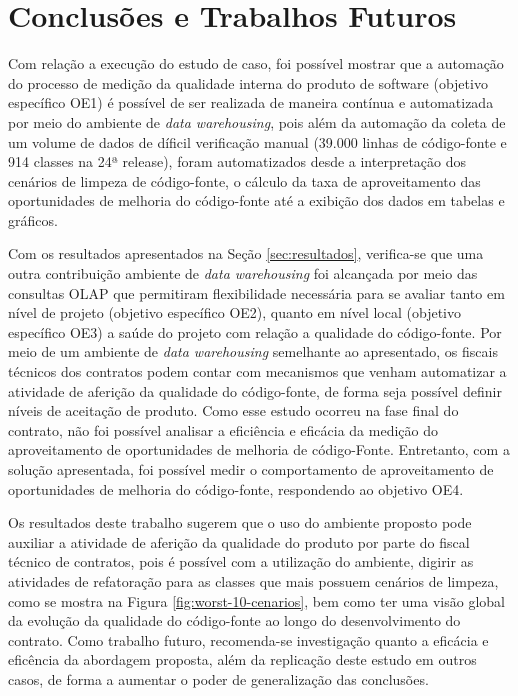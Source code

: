 \section{Conclusões e Trabalhos Futuros}


Com relação a execução do estudo de caso, foi possível mostrar que a automação do processo de medição da qualidade interna do produto de software (objetivo específico OE1)  é possível de ser realizada de maneira contínua e automatizada por meio do ambiente de \textit{data warehousing}, pois além da automação da coleta de um volume de dados de díficil verificação manual (39.000 linhas de código-fonte e 914 classes na 24ª release), foram automatizados desde a interpretação dos cenários de limpeza de código-fonte, o cálculo da taxa de aproveitamento das oportunidades de melhoria do código-fonte até a exibição dos dados em tabelas e gráficos.

Com os resultados apresentados na Seção \ref{sec:resultados}, verifica-se que uma outra contribuição ambiente de \textit{data warehousing} foi alcançada por meio das consultas OLAP que permitiram flexibilidade necessária para se avaliar tanto em nível de projeto (objetivo específico OE2), quanto em nível local (objetivo específico OE3) a saúde do projeto com relação a qualidade do código-fonte. Por meio de um ambiente de \textit{data warehousing} semelhante ao apresentado, os fiscais técnicos dos contratos podem contar com mecanismos que venham automatizar a atividade de aferição da qualidade do código-fonte, de forma seja possível definir níveis de aceitação de produto.
Como esse estudo ocorreu na fase final do contrato, não foi possível analisar a eficiência e eficácia da medição do aproveitamento de oportunidades de melhoria de código-Fonte. Entretanto, com a solução apresentada, foi possível medir o comportamento de aproveitamento de oportunidades de melhoria do código-fonte, respondendo ao objetivo OE4.

Os resultados deste trabalho sugerem que o uso do ambiente proposto pode auxiliar a atividade de aferição da qualidade do produto por parte do fiscal técnico de contratos, pois é possível com a utilização do ambiente, digirir as atividades de refatoração para as classes que mais possuem cenários de limpeza, como se mostra na Figura \ref{fig:worst-10-cenarios}, bem como ter uma visão global da evolução da qualidade do código-fonte ao longo do desenvolvimento do contrato. Como trabalho futuro, recomenda-se investigação quanto a eficácia e eficência da abordagem proposta, além da replicação deste estudo em outros casos, de forma a aumentar o poder de generalização das conclusões.